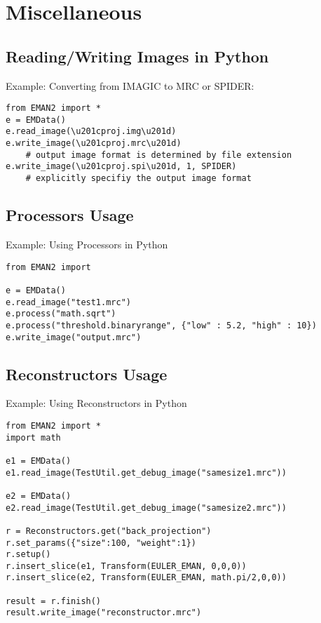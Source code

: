 \section{Miscellaneous}  \label{MISC-DEVELOPERS-GUIDE}

  \subsection{Reading/Writing Images in Python}


    Example: Converting from IMAGIC to MRC or SPIDER:

    \begin{verbatim}from EMAN2 import *
e = EMData()
e.read_image(\u201cproj.img\u201d)
e.write_image(\u201cproj.mrc\u201d)     
    # output image format is determined by file extension
e.write_image(\u201cproj.spi\u201d, 1, SPIDER)  
    # explicitly specifiy the output image format   \end{verbatim}
    \normalcolor

    \subsection{Processors Usage} 
    
    Example: Using Processors in Python

    \begin{verbatim}from EMAN2 import
      
e = EMData()
e.read_image("test1.mrc")
e.process("math.sqrt")
e.process("threshold.binaryrange", {"low" : 5.2, "high" : 10})
e.write_image("output.mrc")     \end{verbatim}
    \normalcolor

    \subsection{Reconstructors Usage} 

    Example: Using Reconstructors in Python

    \begin{verbatim}from EMAN2 import *
import math

e1 = EMData()
e1.read_image(TestUtil.get_debug_image("samesize1.mrc"))

e2 = EMData()
e2.read_image(TestUtil.get_debug_image("samesize2.mrc"))

r = Reconstructors.get("back_projection")
r.set_params({"size":100, "weight":1})
r.setup()
r.insert_slice(e1, Transform(EULER_EMAN, 0,0,0))
r.insert_slice(e2, Transform(EULER_EMAN, math.pi/2,0,0))

result = r.finish()
result.write_image("reconstructor.mrc")\end{verbatim}
    \normalcolor

